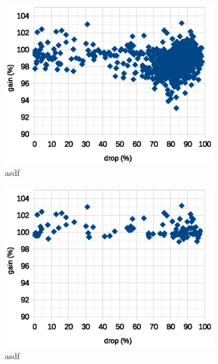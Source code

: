 \documentclass[12pt]{report}
\begin{document}
\begin{center}
	\begin{figure}[h!]
		\centering
		\begin{subfigure}[b]{0.49\linewidth}
			\centering
			\includegraphics[scale=0.7]{dia/all_all.eps}
			\caption{asdf}
		\end{subfigure}
		\begin{subfigure}[b]{0.49\linewidth}
			\centering
			\includegraphics[scale=0.7]{dia/best_all.eps}
			\caption{asdf}
		\end{subfigure}
		\begin{subfigure}[b]{0.49\linewidth}
			\centering

\end{subfigure}
\end{figure}
\end{center}
\end{document}
